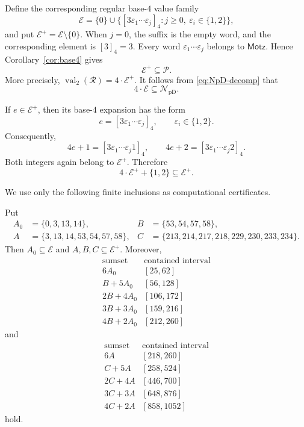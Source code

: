 \documentclass{ws-ijfcs}
\newcommand{\NpD}{\mathcal{N}_{\mathrm{pD}}}
\newcommand{\Pset}{\mathcal P}
\begin{document}
Define the corresponding regular base-$4$ value family
\[
 \mathcal E=\{0\}\cup
 \bigl\{[3\varepsilon_1\cdots\varepsilon_j]_4:
        j\geq0,\ \varepsilon_i\in\{1,2\}\bigr\},
\]
and put $\mathcal E^+=\mathcal E\setminus\{0\}$.  When $j=0$, the
suffix is the empty word, and the corresponding element is $[3]_4=3$.
Every word $\varepsilon_1\cdots\varepsilon_j$ belongs to
$\mathsf{Motz}$.  Hence Corollary~\ref{cor:base4} gives
\[
 \mathcal E^+\subseteq\Pset.
\]
More precisely, $\operatorname{val}_2(\mathcal R)=4\cdot\mathcal E^+$.  It follows from \eqref{eq:NpD-decomp} that
\begin{equation}\label{eq:4E}
 4\cdot\mathcal E\subseteq\NpD.
\end{equation}

If $e\in\mathcal E^+$, then its base-$4$ expansion has the form
\[
 e=[3\varepsilon_1\cdots\varepsilon_j]_4,
 \qquad \varepsilon_i\in\{1,2\}.
\]
Consequently,
\[
 4e+1=[3\varepsilon_1\cdots\varepsilon_j1]_4,
 \qquad
 4e+2=[3\varepsilon_1\cdots\varepsilon_j2]_4.
\]
Both integers again belong to $\mathcal E^+$.  Therefore
\begin{equation}\label{eq:Eclosure}
 4\cdot\mathcal E^++\{1,2\}\subseteq\mathcal E^+.
\end{equation}

We use only the following finite inclusions as computational certificates.

\begin{lemma}
\label{lem:Ecertificate}
Put
\[
\begin{aligned}
 A_0&=\{0,3,13,14\},
 &B&=\{53,54,57,58\},\\
 A&=\{3,13,14,53,54,57,58\},
 &C&=\{213,214,217,218,229,230,233,234\}.
\end{aligned}
\]
Then $A_0\subseteq\mathcal E$ and $A,B,C\subseteq\mathcal E^+$.
Moreover,
\begin{equation}\label{eq:E-small-certificate}
\begin{array}{c|c}
\text{sumset}&\text{contained interval}\\ \hline
6A_0 &[25,62]\\
B+5A_0 &[56,128]\\
2B+4A_0 &[106,172]\\
3B+3A_0 &[159,216]\\
4B+2A_0 &[212,260]
\end{array}
\end{equation}
and
\begin{equation}\label{eq:E-tail-certificate}
\begin{array}{c|c}
\text{sumset}&\text{contained interval}\\ \hline
6A &[218,260]\\
C+5A &[258,524]\\
2C+4A &[446,700]\\
3C+3A &[648,876]\\
4C+2A &[858,1052]
\end{array}
\end{equation}
hold.
\end{lemma}
\end{document}

